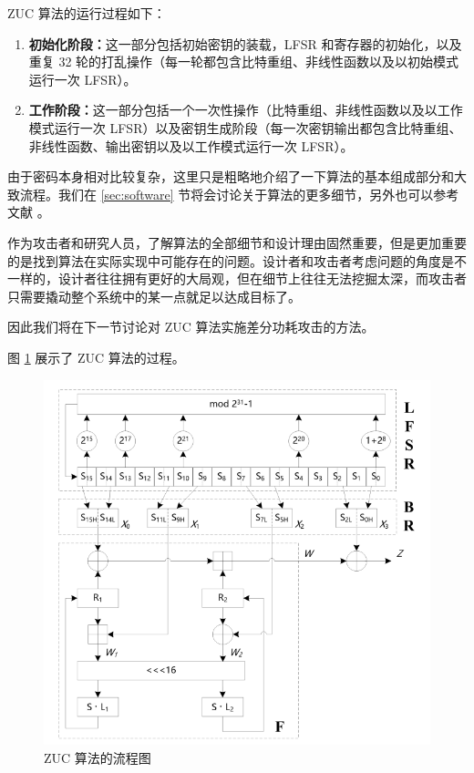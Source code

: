 \vspace*{0.5\baselineskip}

ZUC 算法的运行过程如下：\cite{zuc_standard}

\begin{enumerate}
    \item \textbf{初始化阶段：}这一部分包括初始密钥的装载，LFSR 和寄存器的初始化，以及重复 32 轮的打乱操作（每一轮都包含比特重组、非线性函数以及以初始模式运行一次 LFSR）。
    \item \textbf{工作阶段：}这一部分包括一个一次性操作（比特重组、非线性函数以及以工作模式运行一次 LFSR）以及密钥生成阶段（每一次密钥输出都包含比特重组、非线性函数、输出密钥以及以工作模式运行一次 LFSR）。
\end{enumerate}

\vspace*{0.5\baselineskip}

由于密码本身相对比较复杂，这里只是粗略地介绍了一下算法的基本组成部分和大致流程。我们在 \ref{sec:software} 节将会讨论关于算法的更多细节，另外也可以参考文献 \parencite{zuc_standard}。

作为攻击者和研究人员，了解算法的全部细节和设计理由固然重要，但是更加重要的是找到算法在实际实现中可能存在的问题。设计者和攻击者考虑问题的角度是不一样的，设计者往往拥有更好的大局观，但在细节上往往无法挖掘太深，而攻击者只需要撬动整个系统中的某一点就足以达成目标了。

因此我们将在下一节讨论对 ZUC 算法实施差分功耗攻击的方法。

\vspace*{0.5\baselineskip}

图 \ref{fig:zuc_algo} 展示了 ZUC 算法的过程。

\begin{figure}[htbp]
    \centering
    \includegraphics[height=.5\textheight]{../images/zuc_algo.png}
    \caption{ZUC 算法的流程图 \cite{zuc_standard}}
    \label{fig:zuc_algo}
\end{figure}


